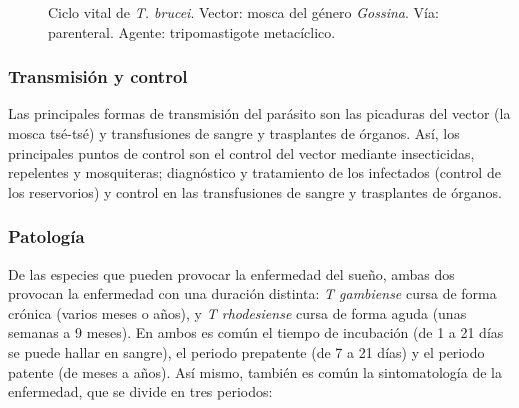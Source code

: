 \begin{figure}[H]
	\caption[Ciclo vital de \textit{T. brucei}]{Ciclo vital de \textit{T. brucei}. Vector: mosca del género \textit{Gossina}. Vía: parenteral. Agente: tripomastigote metacíclico.\label{fig:PARASIT:TBruceiCBios}}
\end{figure}
\subsubsection{Transmisión y control}
Las principales formas de transmisión del parásito son las picaduras del vector (la mosca tsé-tsé) y transfusiones de sangre y trasplantes de órganos. Así, los principales puntos de control son el control del vector mediante insecticidas, repelentes y mosquiteras; diagnóstico y tratamiento de los infectados (control de los reservorios) y control en las transfusiones de sangre y trasplantes de órganos.
\subsubsection{Patología}
De las especies que pueden provocar la enfermedad del sueño, ambas dos provocan la enfermedad con una duración distinta: \textit{T gambiense} cursa de forma crónica (varios meses o años), y \textit{T rhodesiense} cursa de forma aguda (unas semanas a 9 meses). En ambos es común el tiempo de incubación (de 1 a 21 días se puede hallar en sangre), el periodo prepatente (de 7 a 21 días) y el periodo patente (de meses a años). Así mismo, también es común la sintomatología de la enfermedad, que se divide en tres periodos:
